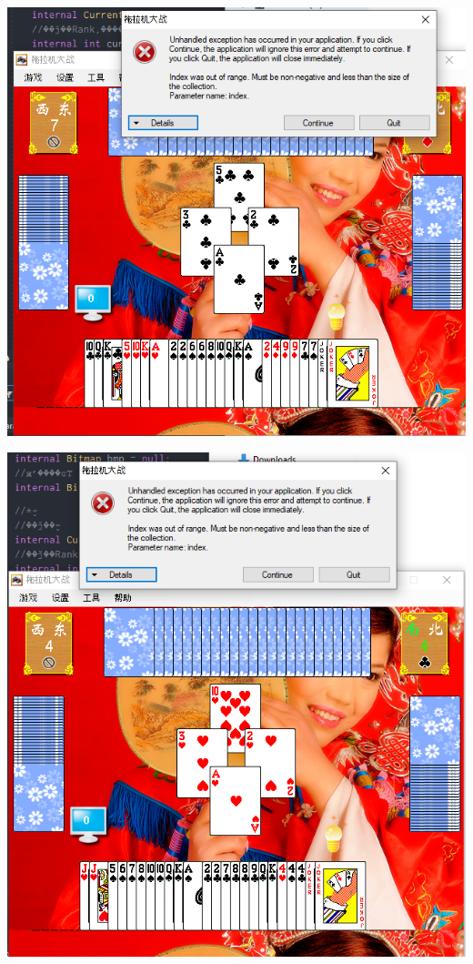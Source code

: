 \documentclass[9pt, b5paper]{article}
\begin{document}
\begin{center}
\includegraphics[width=.9\linewidth]{./pic/readme_20230510_014418.png}
\end{center}

\begin{center}
\includegraphics[width=.9\linewidth]{./pic/readme_20230510_015324.png}
\end{center}
\end{document}
